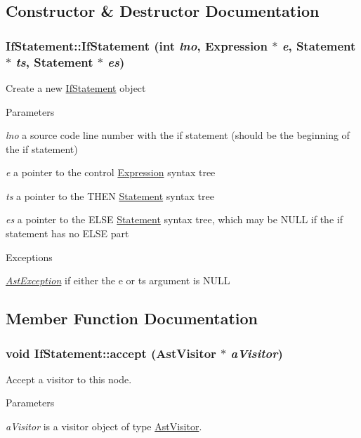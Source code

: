 \subsection{Constructor \& Destructor Documentation}
\hypertarget{classIfStatement_af99bd97270bb7f31932e9ccd3c85d9d3}{
\subsubsection[{IfStatement}]{\setlength{\rightskip}{0pt plus 5cm}IfStatement::IfStatement (int {\em lno}, \/  {\bf Expression} $\ast$ {\em e}, \/  {\bf Statement} $\ast$ {\em ts}, \/  {\bf Statement} $\ast$ {\em es})}}
\label{classIfStatement_af99bd97270bb7f31932e9ccd3c85d9d3}
Create a new \hyperlink{classIfStatement}{IfStatement} object


\begin{DoxyParams}{Parameters}
\item[{\em lno}]a source code line number with the if statement (should be the beginning of the if statement) \item[{\em e}]a pointer to the control \hyperlink{classExpression}{Expression} syntax tree \item[{\em ts}]a pointer to the THEN \hyperlink{classStatement}{Statement} syntax tree \item[{\em es}]a pointer to the ELSE \hyperlink{classStatement}{Statement} syntax tree, which may be NULL if the if statement has no ELSE part \end{DoxyParams}

\begin{DoxyExceptions}{Exceptions}
\item[{\em \hyperlink{classAstException}{AstException}}]if either the e or ts argument is NULL \end{DoxyExceptions}


\subsection{Member Function Documentation}
\hypertarget{classIfStatement_ab4c2cd2f1c924951d782493281d15249}{
\subsubsection[{accept}]{\setlength{\rightskip}{0pt plus 5cm}void IfStatement::accept ({\bf AstVisitor} $\ast$ {\em aVisitor})}}
\label{classIfStatement_ab4c2cd2f1c924951d782493281d15249}
Accept a visitor to this node. 
\begin{DoxyParams}{Parameters}
\item[{\em aVisitor}]is a visitor object of type \hyperlink{classAstVisitor}{AstVisitor}. \end{DoxyParams}


